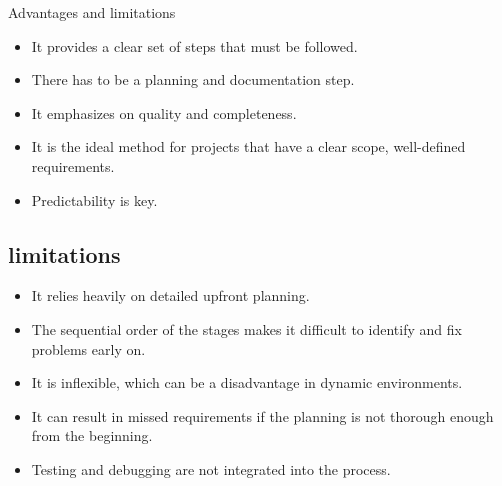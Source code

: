 \begin{section}{Advantages and limitations}
    \begin{itemize}
        \item It provides a clear set of steps that must be followed.
        
        \item There has to be a planning and documentation step.
        
        \item It emphasizes on quality and completeness.
        
        \item It is the ideal method for projects that have a clear scope, well-defined requirements.
        
        \item Predictability is key.
    
    \end{itemize}
    \subsection{limitations}
    
    \begin{itemize}
        \item It relies heavily on detailed upfront planning.
               
        \item The sequential order of the stages makes it difficult to identify and fix problems early on.
        
        \item It is inflexible, which can be a disadvantage in dynamic environments.
        \
        \item It can result in missed requirements if the planning is not thorough enough from the beginning.
        
        \item Testing and debugging are not integrated into the process.
   
    \end{itemize}
    
    
    \end{section}